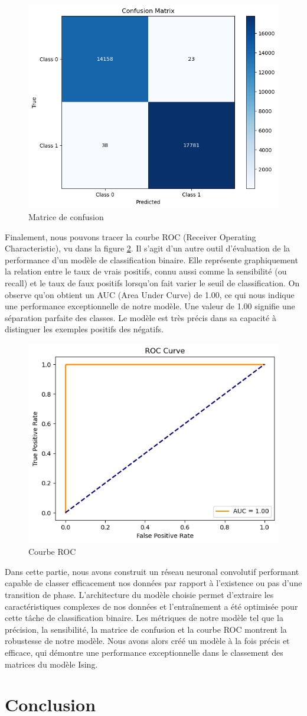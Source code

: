 \documentclass[11pt, parskip=half]{scrartcl} %
\begin{document}
\begin{figure}[h]
	\centering
	\includegraphics[width=0.5\linewidth]{./figures/matrix_CNN.png}
	\caption{Matrice de confusion}
	\label{fig:matrix_CNN}
\end{figure}

Finalement, nous pouvons tracer la courbe ROC (Receiver Operating Characteristic), vu dans la figure \ref{fig:ROC}. Il s’agit d’un autre outil d’évaluation de la performance d’un modèle de classification binaire. Elle représente graphiquement la relation entre le taux de vrais positifs, connu aussi comme la sensibilité (ou recall) et le taux de faux positifs lorsqu’on fait varier le seuil de classification. On observe qu’on obtient un AUC (Area Under Curve) de 1.00, ce qui nous indique une performance exceptionnelle de notre modèle. Une valeur de 1.00 signifie une séparation parfaite des classes. Le modèle est très précis dans sa capacité à distinguer les exemples positifs des négatifs.

\begin{figure}[h]
	\centering
	\includegraphics[width=0.5\linewidth]{./figures/ROC.png}
	\caption{Courbe ROC}
	\label{fig:ROC}
\end{figure}

Dans cette partie, nous avons construit un réseau neuronal convolutif performant capable de classer efficacement nos données par rapport à l’existence ou pas d’une transition de phase. L’architecture du modèle choisie permet d’extraire les caractéristiques complexes de nos données et l’entraînement a été optimisée pour cette tâche de classification binaire. Les métriques de notre modèle tel que la précision, la sensibilité, la matrice de confusion et la courbe ROC montrent la robustesse de notre modèle. Nous avons alors créé un modèle à la fois précis et efficace, qui démontre une performance exceptionnelle dans le classement des matrices du modèle Ising.

\section*{Conclusion}
\end{document}
